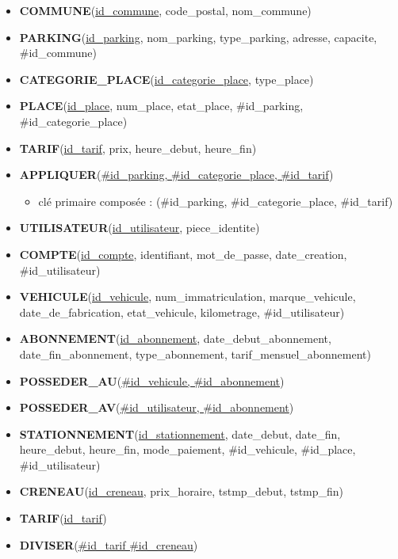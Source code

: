 \documentclass[a4paper,12pt]{report}
\begin{document}
\begin{itemize}
    \item \textbf{COMMUNE}(\underline{id\_commune}, code\_postal, nom\_commune)
    
    \item \textbf{PARKING}(\underline{id\_parking}, nom\_parking, type\_parking, adresse, capacite, \#id\_commune)
    
    \item \textbf{CATEGORIE\_PLACE}(\underline{id\_categorie\_place}, type\_place)
    
    \item \textbf{PLACE}(\underline{id\_place}, num\_place, etat\_place, \#id\_parking, \#id\_categorie\_place)
    
    \item \textbf{TARIF}(\underline{id\_tarif}, prix, heure\_debut, heure\_fin)
    
    \item \textbf{APPLIQUER}(\underline{\#id\_parking, \#id\_categorie\_place, \#id\_tarif})
    \begin{itemize}
        \item clé primaire composée : (\#id\_parking, \#id\_categorie\_place, \#id\_tarif)
    \end{itemize}
    
    \item \textbf{UTILISATEUR}(\underline{id\_utilisateur}, piece\_identite)
    
    \item \textbf{COMPTE}(\underline{id\_compte}, identifiant, mot\_de\_passe, date\_creation, \#id\_utilisateur)
    
    \item \textbf{VEHICULE}(\underline{id\_vehicule}, num\_immatriculation, marque\_vehicule, date\_de\_fabrication,
    etat\_vehicule, kilometrage, \#id\_utilisateur)
    
    \item \textbf{ABONNEMENT}(\underline{id\_abonnement}, date\_debut\_abonnement, date\_fin\_abonnement,
    type\_abonnement, tarif\_mensuel\_abonnement)
    
    \item \textbf{POSSEDER\_AU}(\underline{\#id\_vehicule, \#id\_abonnement})
    
    \item \textbf{POSSEDER\_AV}(\underline{\#id\_utilisateur, \#id\_abonnement})
    
    \item \textbf{STATIONNEMENT}(\underline{id\_stationnement}, date\_debut, date\_fin, heure\_debut, heure\_fin,
    mode\_paiement, \#id\_vehicule, \#id\_place, \#id\_utilisateur)
    
    \item \textbf{CRENEAU}(\underline{id\_creneau}, prix\_horaire, tstmp\_debut, tstmp\_fin)
    \item \textbf{TARIF}(\underline{id\_tarif})
    \item \textbf{DIVISER}(\underline{\#id\_tarif \#id\_creneau})
\end{itemize}
\end{document}
